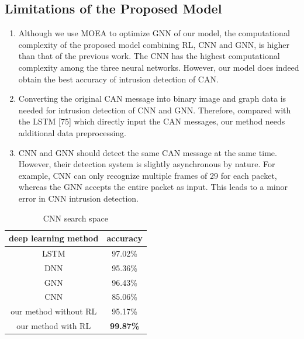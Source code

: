 \documentclass[lettersize,journal]{IEEEtran}
\begin{document}
\subsection{Limitations of the Proposed Model}
\begin{enumerate}
\item{Although we use MOEA to optimize GNN of our model, the computational complexity of the proposed model combining RL, CNN and GNN, is higher than that of the previous work. The CNN has the highest computational complexity among the three neural networks. However, our model does indeed obtain the best accuracy of intrusion detection of CAN.}
\item{Converting the original CAN message into binary image and graph data is needed for intrusion detection of CNN and GNN. Therefore, compared with the LSTM [75] which directly input the CAN messages, our method needs additional data preprocessing.}
\item{CNN and GNN should detect the same CAN message at the same time. However, their detection system is slightly asynchronous by nature. For example, CNN can only recognize multiple frames of 29 for each packet, whereas the GNN accepts the entire packet as input. This leads to a minor error in CNN intrusion detection.}
\end{enumerate}

\begin{table}[!t]
\caption{CNN search space\label{table5}}
\centering
\begin{tabular}{cc}
\hline
deep learning method & accuracy\\
\hline
LSTM\cite{49} & 97.02\%\\
DNN\cite{75} & 95.36\%\\
GNN & 96.43\%\\
CNN\cite{48} & 85.06\%\\
our method without RL & 95.17\%\\
our method with RL & \textbf{99.87\%}\\
\hline
\end{tabular}
\end{table}
\end{document}
